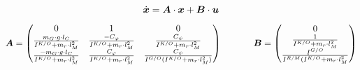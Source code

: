 \begin{equation}
\dot{\boldsymbol{x}}=\boldsymbol{A}\cdot \boldsymbol{x}+\boldsymbol{B}\cdot \boldsymbol{u}
\end{equation}
\begin{equation}
\boldsymbol{A} = \begin{pmatrix}
 0 & 1 & 0 \\
 \frac{m_G\cdot g\cdot l_C}{I^{K/O}+m_r\cdot l^2_M} & 
 \frac{-C_{\varphi}}{I^{K/O}+m_r\cdot l^2_M} &
 \frac{C_{\psi}}{I^{K/O}+m_r\cdot l^2_M} \\
 \frac{-m_G\cdot g \cdot l_C}{I^{K/O}+m_r\cdot l^2_M} &
 \frac{C_{\varphi}}{I^{K/O}+m_r\cdot l^2_M} &
 \frac{C_{\psi}}{I^{G/O}(I^{K/O}+m_r\cdot l^2_M)}
\end{pmatrix}
\hspace{35pt}
\boldsymbol{B} = \begin{pmatrix}
0 \\ \frac{1}{I^{K/O}+m_r\cdot l^2_M} \\ \frac{I^{G/O}}{I^{R/M}(I^{K/O}+m_r \cdot l^2_M}
\end{pmatrix}
\end{equation}

